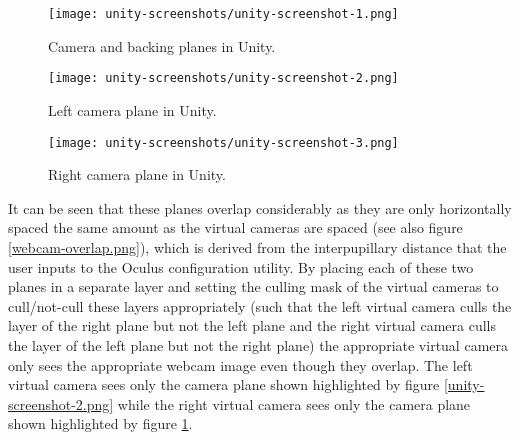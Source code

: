 \begin{figure}[h]
    \begin{center}
    \begin{minipage}[t]{.32\textwidth}
        \begin{center}
        \texttt{[image: unity-screenshots/unity-screenshot-1.png]}
        \caption{Camera and backing planes in Unity.}
        \label{unity-screenshot-1.png}
        \end{center}
    \end{minipage}%
    \hspace{.01\textwidth}
    \begin{minipage}[t]{.32\textwidth}
		\begin{center}
        \texttt{[image: unity-screenshots/unity-screenshot-2.png]}
        \caption{Left camera plane in Unity.}
        \label{unity-screenshot-2.png}
        \end{center}
    \end{minipage}%
    \hspace{.01\textwidth}
    \begin{minipage}[t]{.32\textwidth}
        \begin{center}
        \texttt{[image: unity-screenshots/unity-screenshot-3.png]}
        \caption{Right camera plane in Unity.}
        \label{unity-screenshot-3.png}
        \end{center}
    \end{minipage}
    \end{center}
\end{figure}

It can be seen that these planes overlap considerably as they are only horizontally spaced the same amount as the virtual cameras are spaced (see also figure \ref{webcam-overlap.png}), which is derived from the interpupillary distance that the user inputs to the Oculus configuration utility. By placing each of these two planes in a separate layer and setting the culling mask of the virtual cameras to cull/not-cull these layers appropriately (such that the left virtual camera culls the layer of the right plane but not the left plane and the right virtual camera culls the layer of the left plane but not the right plane) the appropriate virtual camera only sees the appropriate webcam image even though they overlap. The left virtual camera sees only the camera plane shown highlighted by figure \ref{unity-screenshot-2.png} while the right virtual camera sees only the camera plane shown highlighted by figure \ref{unity-screenshot-3.png}.

